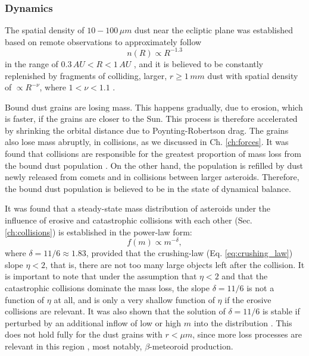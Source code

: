 \subsubsection{Dynamics}

The spatial density of $10 - 100 \, \si{\mu m}$ dust near the ecliptic plane was established based on remote observations to approximately follow 
\begin{equation}
    n(R) \propto R^{-1.3} \label{eq:dust_number_density}
\end{equation}
in the range of $0.3 \, \si{AU} < R < 1 \, \si{AU}$ \citep{leinert1981zodiacal}, and it is believed to be constantly replenished by fragments of colliding, larger, $r \geq 1 \, \si{mm}$ dust with spatial density of $\propto R^{-\nu}$, where $1 < \nu < 1.1$ \citep{leinert1983maintain}.

Bound dust grains are losing mass. This happens gradually, due to erosion, which is faster, if the grains are closer to the Sun. This process is therefore accelerated by shrinking the orbital distance due to Poynting-Robertson drag. The grains also lose mass abruptly, in collisions, as we discussed in Ch. \ref{ch:forces}. It was found that collisions are responsible for the greatest proportion of mass loss from the bound dust population \citep{grun1985collisional}. On the other hand, the population is refilled by dust newly released from comets and in collisions between larger asteroids. Therefore, the bound dust population is believed to be in the state of dynamical balance. 

It was found \citep{dohnanyi1969collisional} that a steady-state mass distribution of asteroids under the influence of erosive and catastrophic collisions with each other (Sec. \ref{ch:collisions}) is established in the power-law form:
\begin{equation}
    f(m) \propto m^{-\delta}, \label{eq:mass_distribution}
\end{equation}
where $\delta = 11/6 \approx 1.83$, provided that the crushing-law (Eq. \ref{eq:crushing_law}) slope $\eta < 2$, that is, there are not too many large objects left after the collision. It is important to note that under the assumption that $\eta < 2$ and that the catastrophic collisions dominate the mass loss, the slope $\delta = 11/6$ is not a function of $\eta$ at all, and is only a very shallow function of $\eta$ if the erosive collisions are relevant. It was also shown that the solution of $\delta = 11/6$ is stable if perturbed by an additional inflow of low or high $m$ into the distribution \citep{dohnanyi1969collisional}. This does not hold fully for the dust grains with $r < \si{\mu m}$, since more loss processes are relevant in this region \citep{grun1985collisional}, most notably, $\beta$-meteoroid production.

